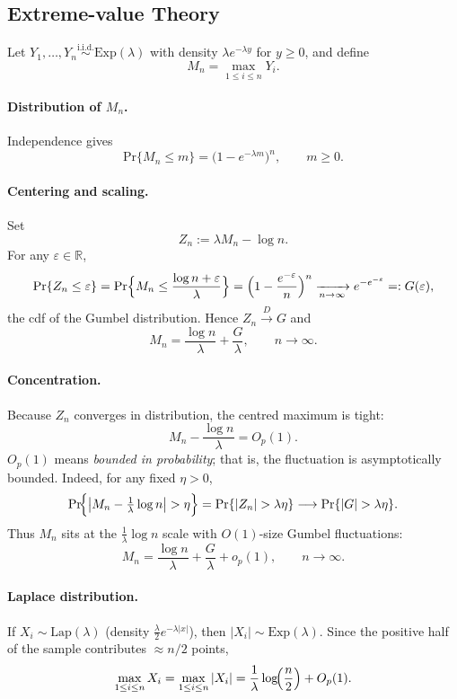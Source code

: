 \subsection{Extreme-value Theory}
\label{sec:EVT}

Let \(Y_1,\dots,Y_n\overset{\text{i.i.d.}}{\sim}\mathrm{Exp}(\lambda)\) with
density \(\lambda e^{-\lambda y}\) for \(y\ge0\), and define
\[
M_n=\max_{1\le i\le n} Y_i .
\]

\paragraph{Distribution of \(M_n\).}
Independence gives
\[
\text{Pr}\{M_n\le m\}
      =\bigl(1-e^{-\lambda m}\bigr)^{n},
      \qquad m\ge0 .
\]

\paragraph{Centering and scaling.}
Set
\[
Z_n:=\lambda M_n-\log n .
\]
For any \(\varepsilon\in\mathbb R\),
\[
\text{Pr}\{Z_n\le\varepsilon\}
      =\text{Pr}\Bigl\{M_n\le\frac{\log n+\varepsilon}{\lambda}\Bigr\}
      =\Bigl(1-\frac{e^{-\varepsilon}}{n}\Bigr)^{n}
      \xrightarrow[n\to\infty]{} e^{-e^{-\varepsilon}}
      =:G(\varepsilon),
\]
the cdf of the Gumbel distribution.  Hence \(Z_n\overset{D}{\to}G\) and
\[
M_n=\frac{\log n}{\lambda}+\frac{G}{\lambda}, \qquad n\to\infty .
\]

\paragraph{Concentration.}
Because \(Z_n\) converges in distribution, the centred maximum is tight:
\[
M_n-\frac{\log n}{\lambda}=O_p(1).
\]
$O_p(1)$ means \emph{bounded in probability}; that is, the fluctuation is asymptotically bounded. Indeed, for any fixed \(\eta>0\),
\[
\text{Pr}\!\Bigl\{\bigl|M_n-\tfrac1\lambda\log n\bigr|>\eta\Bigr\}
      =\text{Pr}\{|Z_n|>\lambda\eta\}
      \longrightarrow
      \text{Pr}\{|G|>\lambda\eta\}.
\]
Thus \(M_n\) sits at the \(\tfrac1\lambda\log n\) scale with
\(O(1)\)-size Gumbel fluctuations:
\[
M_n=\frac{\log n}{\lambda}+\frac{G}{\lambda}+o_p(1),\qquad n\to\infty .
\]

\paragraph{Laplace distribution.}
If \(X_i\sim\mathrm{Lap}(\lambda)\) (density
\(\tfrac{\lambda}{2}e^{-\lambda|x|}\)),
then \(|X_i|\sim\mathrm{Exp}(\lambda)\).  Since the positive half of the
sample contributes \(\approx n/2\) points,
\[
\max_{1\le i\le n}X_i
      =\max_{1\le i\le n}|X_i|
      =\frac1\lambda\log\!\Bigl(\frac{n}{2}\Bigr)+O_p(1).
\]

